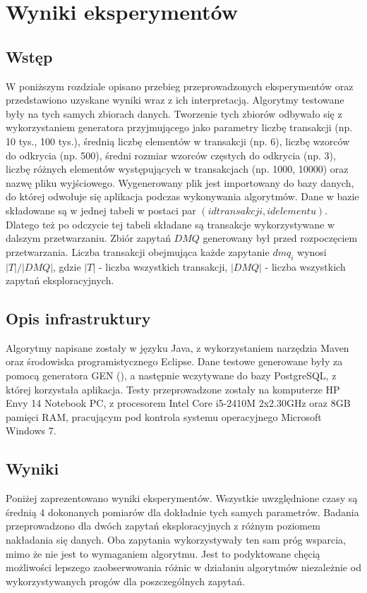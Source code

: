 \chapter{Wyniki eksperymentów}
\label{c5}

\section{Wstęp}
\label{c51}
W poniższym rozdziale opisano przebieg przeprowadzonych eksperymentów oraz przedstawiono uzyskane wyniki wraz z ich interpretacją. Algorytmy testowane były na tych samych zbiorach danych. Tworzenie tych zbiorów odbywało się z wykorzystaniem generatora przyjmującego jako parametry liczbę transakcji (np. 10 tys., 100 tys.), średnią liczbę elementów w transakcji (np. 6), liczbę wzorców do odkrycia (np. 500), średni rozmiar wzorców częstych do odkrycia (np. 3), liczbę różnych elementów występujących w transakcjach (np. 1000, 10000) oraz nazwę pliku wyjściowego. Wygenerowany plik jest importowany do bazy danych, do której odwołuje się aplikacja podczas wykonywania algorytmów. Dane w bazie składowane są w jednej tabeli w postaci par \((id transakcji, id elementu)\). Dlatego też po odczycie tej tabeli składane są transakcje wykorzystywane w dalszym przetwarzaniu. Zbiór zapytań \(DMQ\) generowany był przed rozpoczęciem przetwarzania. Liczba transakcji obejmująca każde zapytanie \(dmq_i\) wynosi \(|T|/|DMQ|\), gdzie \(|T|\) - liczba wszystkich transakcji, \(|DMQ|\) - liczba wszystkich zapytań eksploracyjnych. 

\section{Opis infrastruktury}
\label{c52}
Algorytmy napisane zostały w języku Java, z wykorzystaniem narzędzia Maven oraz środowiska programistycznego Eclipse. Dane testowe generowane były za pomocą generatora GEN (\cite{AgrawalGEN}), a następnie wczytywane do bazy PostgreSQL, z której korzystała aplikacja. Testy przeprowadzone zostały na komputerze HP Envy 14 Notebook PC, z procesorem Intel Core i5-2410M 2x2.30GHz oraz 8GB pamięci RAM, pracującym pod kontrola systemu operacyjnego Microsoft Windows 7. 

\section{Wyniki}
\label{c53}
Poniżej zaprezentowano wyniki eksperymentów. Wszystkie uwzględnione czasy są średnią 4 dokonanych pomiarów dla dokładnie tych samych parametrów. Badania przeprowadzono dla dwóch zapytań eksploracyjnych z różnym poziomem nakładania się danych. Oba zapytania wykorzystywały ten sam próg wsparcia, mimo że nie jest to wymaganiem algorytmu. Jest to podyktowane chęcią możliwości lepszego zaobserwowania różnic w działaniu algorytmów niezależnie od wykorzystywanych progów dla poszczególnych zapytań. 

